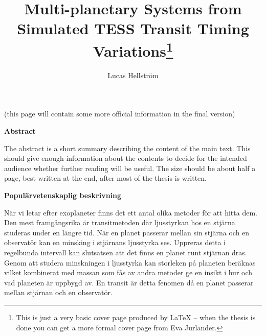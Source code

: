 \documentclass[12pt]{report}
\begin{document}
\title{\huge \bf Multi-planetary Systems from Simulated TESS Transit Timing Variations\footnote{This is just a very basic cover page produced by LaTeX -- when
the thesis is done you can get a more formal cover page from Eva Jurlander.}}
\author{Lucas Hellström}

\thispagestyle{empty} %

\maketitle

\newpage

\thispagestyle{empty}

\begin{center}
  (this page will contain some more official information in the final version)
\end{center}

\newpage

\thispagestyle{empty}

\begin{center}
  {\bf Abstract}
\end{center}
The abstract is a short summary describing the content of the main text. This
should give enough information about the contents to decide for the intended
audience whether further reading will be useful. The size should be about half
a page, best written at the end, after most of the thesis is written.

\newpage

\thispagestyle{empty}
\mbox{} %

\newpage

\thispagestyle{empty}

\begin{center}
  {\bf Popul\"arvetenskaplig beskrivning}
\end{center}
	När vi letar efter exoplaneter finns det ett antal olika metoder för att hitta dem. Den mest framgångsrika är transitmetoden där ljusstyrkan hos en stjärna studeras under en längre tid. När en planet passerar mellan sin stjärna och en observatör kan en minsking i stjärnans ljusstyrka ses. Uppreras detta i regelbunda intervall kan slutsatsen att det finns en planet runt stjärnan dras. Genom att studera minskningen i ljusstyrka kan storleken på planeten beräknas vilket kombinerat med massan som fås av andra metoder ge en insikt i hur och vad planeten är uppbygd av. En transit är detta fenomen då en planet passerar mellan stjärnan och en observatör.
	
\end{document}
